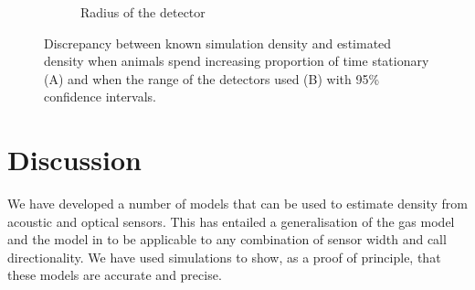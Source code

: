 \documentclass[a4paper,10pt,reqno,oneside]{amsart}
\begin{document}
\begin{figure}[t]
\begin{subfigure}[t]{0.5\textwidth}
                \caption{Radius of the detector}
                \label{f:Radii}
        \end{subfigure}
	\caption{Discrepancy between known simulation density and estimated density when animals spend increasing proportion of time stationary (A) and when the range of  the detectors used (B) with 95\% confidence intervals.}
	\label{f:distanceDensity}
\end{figure}

\section{Discussion}


We have developed a number of models that can be used to estimate density from acoustic and optical sensors. This has entailed a generalisation of the gas model and the model in \cite{rowcliffe2008estimating} to be applicable to any combination of sensor width and call directionality. We have used simulations to show, as a proof of principle, that these models are accurate and precise. %
\end{document}
